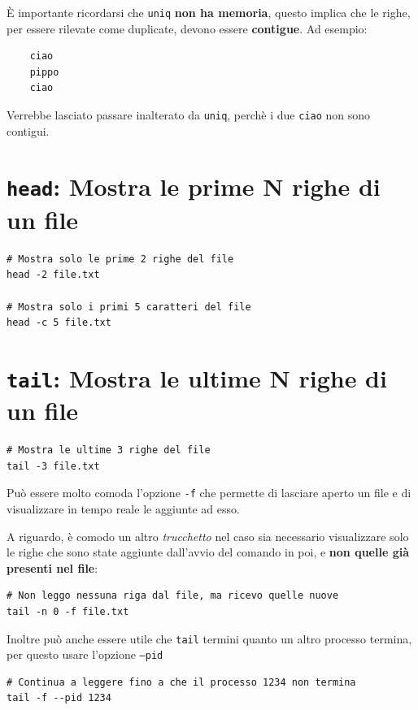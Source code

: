 \documentclass[a4paper]{report}
\newenvironment{info}{\begin{tcolorbox}[fonttitle=\sffamily\bfseries\large,title=Info,colframe=blue!75!white]}{\end{tcolorbox}}
\newenvironment{code}{\begin{tcolorbox}[size=small]}{\end{tcolorbox}}
\begin{document}
\begin{info}
	È importante ricordarsi che \texttt{uniq} \textbf{non ha memoria}, questo implica che le righe, per essere rilevate come duplicate, devono essere \textbf{contigue}. Ad esempio:
	\begin{lstlisting}
	ciao
	pippo
	ciao
	\end{lstlisting}
	
	Verrebbe lasciato passare inalterato da \texttt{uniq}, perchè i due \texttt{ciao} non sono contigui.
\end{info}

\section{\texttt{head}: Mostra le prime N righe di un file}
\begin{code}
	\begin{lstlisting}
# Mostra solo le prime 2 righe del file
head -2 file.txt

# Mostra solo i primi 5 caratteri del file
head -c 5 file.txt
	\end{lstlisting}
\end{code}

\section{\texttt{tail}: Mostra le ultime N righe di un file}
\begin{code}
	\begin{lstlisting}
# Mostra le ultime 3 righe del file
tail -3 file.txt
	\end{lstlisting}
\end{code}

\begin{info}
	Può essere molto comoda l'opzione \texttt{-f} che permette di lasciare aperto un file e di visualizzare in tempo reale le aggiunte ad esso.
	
	A riguardo, è comodo un altro \textit{trucchetto} nel caso sia necessario visualizzare solo le righe che sono state aggiunte dall'avvio del comando in poi, e \textbf{non quelle già presenti nel file}:
	\begin{lstlisting}
# Non leggo nessuna riga dal file, ma ricevo quelle nuove
tail -n 0 -f file.txt
	\end{lstlisting}
	
	Inoltre può anche essere utile che \texttt{tail} termini quanto un altro processo termina, per questo usare l'opzione \texttt{--pid}
	
	\begin{lstlisting}
# Continua a leggere fino a che il processo 1234 non termina
tail -f --pid 1234
	\end{lstlisting}
\end{info}
\end{document}
